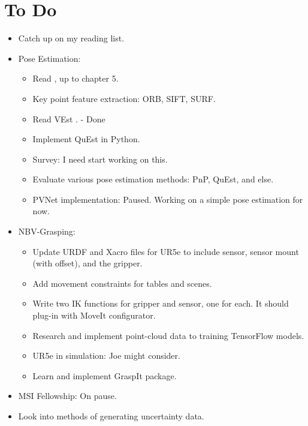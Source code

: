 \documentclass[11pt]{article}
\begin{document}
\section{To Do}
\begin{itemize}
  \item Catch up on my reading list.
  \item Pose Estimation:
  \begin{itemize}
      \item Read \cite{ma2012invitation}, up to chapter 5.
      \item Key point feature extraction: ORB, SIFT, SURF.
      \item Read VEst \cite{dani2009position}. - Done
      \item Implement QuEst in Python.
      \item Survey: I need start working on this.
      \item Evaluate various pose estimation methods: PnP, QuEst, and else.
      \item PVNet implementation: Paused. Working on a simple pose estimation for now.
  \end{itemize}
  \item NBV-Grasping:
      \begin{itemize}
      \item Update URDF and Xacro files for UR5e to include sensor,
sensor mount (with offset), and the gripper.
      \item Add movement constraints for tables and scenes.
      \item Write two IK functions for gripper and sensor, one for each. It should plug-in with MoveIt configurator.
      \item Research and implement point-cloud data to training TensorFlow models.
      \item UR5e in simulation: Joe might consider.
      \item Learn and implement GraspIt package.
      \end{itemize}

  \item MSI Fellowship: On pause.
  \item Look into methods of generating uncertainty data.
\end{itemize}
\end{document}

